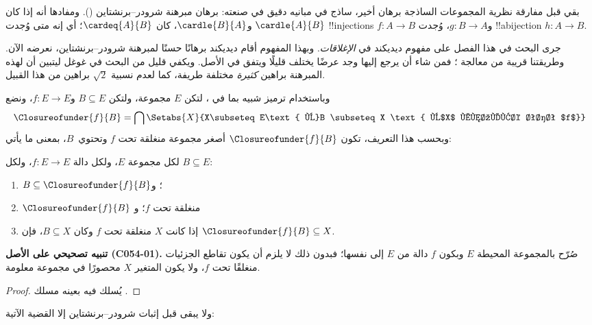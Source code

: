\documentclass[../../../include/open-logic-section]{subfiles}
\begin{document}


بقي قبل مفارقة نظرية المجموعات الساذجة برهان أخير، ساذج في مبانيه دقيق في صنعته: برهان مبرهنة شرودر–برنشتاين
(). ومفادها أنه إذا كان
$\cardle{A}{B}$ و$\cardle{B}{A}$، كان $\cardeq{A}{B}$؛ أي إنه متى وُجدت
!!{injection}s $f \colon A \to B$ و$g \colon B \to A$، وُجدت
!!a{bijection} $h \colon A \to B$.

جرى البحث في هذا الفصل على مفهوم ديديكند في \emph{الإغلاقات}. وبهذا المفهوم أقام ديديكند برهانًا حسنًا لمبرهنة شرودر–برنشتاين، نعرضه الآن. وطريقتنا قريبة من معالجة
\citet[صص.~157--8]{Potter2004}؛ فمن شاء أن يرجع إليها وجد عرضًا يختلف قليلًا ويتفق في الأصل. ويكفي قليل من البحث في غوغل ليتبين أن لهذه المبرهنة براهين
\emph{كثيرة} مختلفة طريفة، كما لعدم نسبية
$\sqrt{2}$ براهين من هذا القبيل.

وباستخدام ترميز شبيه بما في
، لتكن $E$ مجموعة، ولتكن
$B\subseteq E$ و$f\colon E\to E$، ونضع
\[
\Closureofunder{f}{B} = \bigcap \Setabs{X}{X\subseteq E\text{ و}B \subseteq X
\text{ و$X$ منغلقة تحت $f$}}
\]
وبحسب هذا التعريف، تكون
$\Closureofunder{f}{B}$ أصغر مجموعة منغلقة تحت $f$ وتحتوي~$B$، بمعنى
ما يأتي:

\begin{lem}
	لكل مجموعة $E$، ولكل دالة $f\colon E\to E$، ولكل $B\subseteq E$:
	\begin{enumerate}
		\item{} $B \subseteq \Closureofunder{f}{B}$؛ و
		\item{} $\Closureofunder{f}{B}$ منغلقة تحت $f$؛ و
		\item{} إذا كانت $X$ منغلقة تحت $f$ وكان $B
		\subseteq X$، فإن $\Closureofunder{f}{B} \subseteq X$.
	\end{enumerate}
\end{lem}

\textbf{تنبيه تصحيحي على الأصل (C054-01).} صُرّح بالمجموعة المحيطة $E$ وبكون
$f$ دالة من $E$ إلى نفسها؛ فبدون ذلك لا يلزم أن يكون تقاطع الجزئيات
منغلقًا تحت $f$، ولا يكون المتغير $X$ محصورًا في مجموعة معلومة.

\begin{proof}
يُسلك فيه بعينه مسلك .
\end{proof}

ولا يبقى قبل إثبات شرودر–برنشتاين إلا القضية الآتية:
\end{document}
